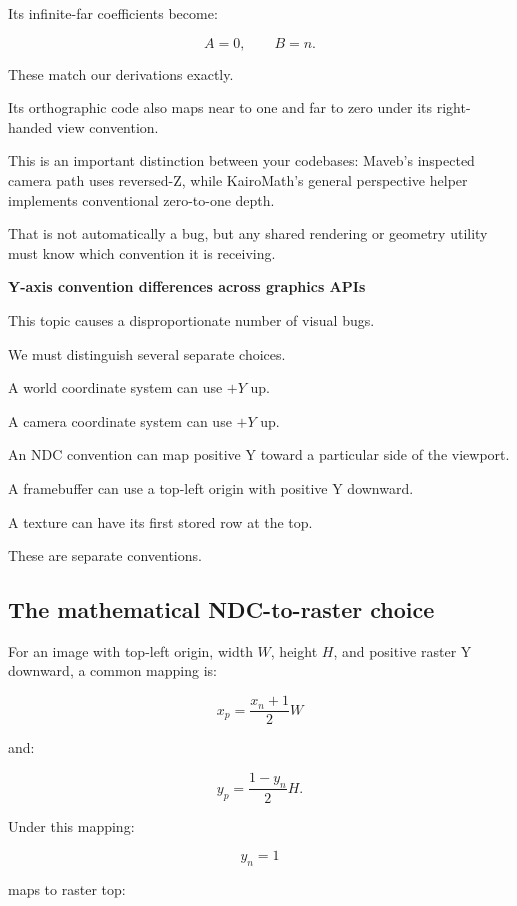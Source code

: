 Its infinite-far coefficients become:

\[
 \boxed{ A=0,\qquad B=n }.
\]

These match our derivations exactly.

Its orthographic code also maps near to one and far to zero under its right-handed view convention.

This is an important distinction between your codebases: Maveb's inspected camera path uses reversed-Z, while KairoMath's general perspective helper implements conventional zero-to-one depth.

That is not automatically a bug, but any shared rendering or geometry utility must know which convention it is receiving.

\textbf{Y-axis convention differences across graphics APIs}

This topic causes a disproportionate number of visual bugs.

We must distinguish several separate choices.

A world coordinate system can use \(+Y\) up.

A camera coordinate system can use \(+Y\) up.

An NDC convention can map positive Y toward a particular side of the viewport.

A framebuffer can use a top-left origin with positive Y downward.

A texture can have its first stored row at the top.

These are separate conventions.

\subsection{The mathematical NDC-to-raster choice}\label{02-foundations-ii-ch033-the-mathematical-ndc-to-raster-choice}

\hypertarget{02-foundations-ii-ch033-the-mathematical-ndc-to-raster-choice}{}

For an image with top-left origin, width \(W\), height \(H\), and positive raster Y downward, a common mapping is:

\[
 \boxed{ x_p=\frac{x_n+1}{2}W }
\]

and:

\[
 \boxed{ y_p=\frac{1-y_n}{2}H }.
\]

Under this mapping:

\[
 y_n=1
\]

maps to raster top:


